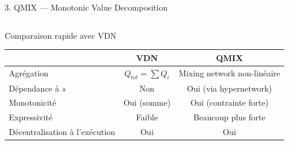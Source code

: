 \documentclass{beamer}
\begin{document}
\begin{frame}{3. QMIX — Monotonic Value Decomposition}
\begin{columns}[T]
\end{columns}

\vspace{0.6em}

\begin{exampleblock}{Comparaison rapide avec VDN}
\begin{tabular}{l@{\qquad}c@{\qquad}c}
& VDN & QMIX \\
\hline
Agrégation & $Q_{tot} = \sum Q_i$ & Mixing network non-linéaire \\
Dépendance à $s$ & Non & Oui (via hypernetwork) \\
Monotonicité & Oui (somme) & Oui (contrainte forte) \\
Expressivité & Faible & Beaucoup plus forte \\
Décentralisation à l’exécution & Oui & Oui \\
\end{tabular}
\end{exampleblock}

\end{frame}
\end{document}
